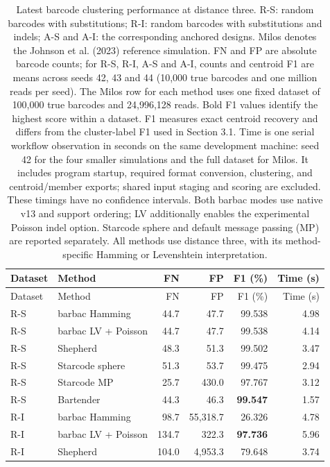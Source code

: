 \begin{longtable}{llrrrr}
\caption{Latest barcode clustering performance at distance three. R-S: random barcodes with substitutions; R-I: random barcodes with substitutions and indels; A-S and A-I: the corresponding anchored designs. Milos denotes the Johnson et al. (2023) reference simulation. FN and FP are absolute barcode counts; for R-S, R-I, A-S and A-I, counts and centroid F1 are means across seeds 42, 43 and 44 (10,000 true barcodes and one million reads per seed). The Milos row for each method uses one fixed dataset of 100,000 true barcodes and 24,996,128 reads. Bold F1 values identify the highest score within a dataset. F1 measures exact centroid recovery and differs from the cluster-label F1 used in Section 3.1. Time is one serial workflow observation in seconds on the same development machine: seed 42 for the four smaller simulations and the full dataset for Milos. It includes program startup, required format conversion, clustering, and centroid/member exports; shared input staging and scoring are excluded. These timings have no confidence intervals. Both barbac modes use native v13 and support ordering; LV additionally enables the experimental Poisson indel option. Starcode sphere and default message passing (MP) are reported separately. All methods use distance three, with its method-specific Hamming or Levenshtein interpretation.}\label{tab:latest-barbac}\\
\toprule
Dataset & Method & FN & FP & F1 (\%) & Time (s) \\
\midrule
\endfirsthead
\toprule
Dataset & Method & FN & FP & F1 (\%) & Time (s) \\
\midrule
\endhead
R-S & barbac Hamming & 44.7 & 47.7 & 99.538 & 4.98 \\
R-S & barbac LV + Poisson & 44.7 & 47.7 & 99.538 & 4.14 \\
R-S & Shepherd & 48.3 & 51.3 & 99.502 & 3.47 \\
R-S & Starcode sphere & 51.3 & 53.7 & 99.475 & 2.94 \\
R-S & Starcode MP & 25.7 & 430.0 & 97.767 & 3.12 \\
R-S & Bartender & 44.3 & 46.3 & \textbf{99.547} & 1.57 \\
R-I & barbac Hamming & 98.7 & 55,318.7 & 26.326 & 4.78 \\
R-I & barbac LV + Poisson & 134.7 & 322.3 & \textbf{97.736} & 5.96 \\
R-I & Shepherd & 104.0 & 4,953.3 & 79.648 & 3.74 \\

\end{longtable}
